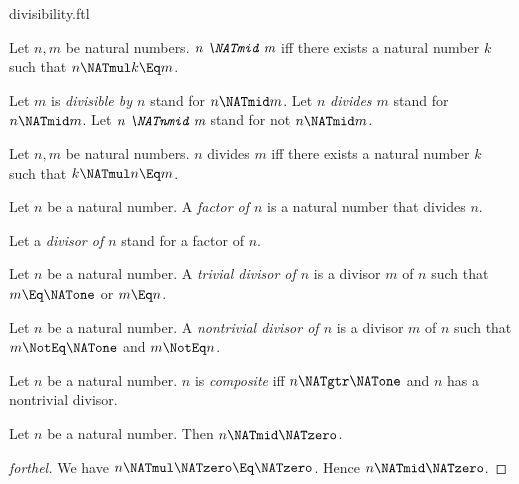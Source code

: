 \documentclass{stex}
\begin{document}
\begin{smodule}{divisibility.ftl}

\begin{definition}[forthel,id=ARITHMETIC_07_4239998993825792]
  Let $n, m$ be natural numbers.
  $\emph{n \NATmid m}$ iff there exists a natural number $k$ such that $n \NATmul k \Eq m$.

  Let $m$ is \emph{divisible by $n$} stand for $n \NATmid m$.
  Let $n$ \emph{divides $m$} stand for $n \NATmid m$.
  Let $\emph{n \NATnmid m}$ stand for not $n \NATmid m$.
\end{definition}

\begin{lemma}[forthel,id=ARITHMETIC_07_1478855118290944]
  Let $n, m$ be natural numbers.
  $n$ divides $m$ iff there exists a natural number $k$ such that $k \NATmul n \Eq m$.
\end{lemma}

\begin{definition}[forthel,id=ARITHMETIC_07_1311437490225152]
  Let $n$ be a natural number.
  A \emph{factor of $n$} is a natural number that divides $n$.

  Let a \emph{divisor of $n$} stand for a factor of $n$.
\end{definition}

\begin{definition}[forthel,id=ARITHMETIC_10_5438991513944064]
  Let $n$ be a natural number.
  A \emph{trivial divisor of $n$} is a divisor $m$ of $n$ such that $m \Eq \NATone$ or $m \Eq n$.
\end{definition}

\begin{definition}[forthel,id=ARITHMETIC_10_8768240253665280]
  Let $n$ be a natural number.
  A \emph{nontrivial divisor of $n$} is a divisor $m$ of $n$ such that $m \NotEq \NATone$ and $m \NotEq n$.
\end{definition}

\begin{definition}[forthel,id=ARITHMETIC_10_8020087063707648]
  Let $n$ be a natural number.
  $n$ is \emph{composite} iff $n \NATgtr \NATone$ and $n$ has a nontrivial divisor.
\end{definition}

\begin{proposition}[forthel,id=ARITHMETIC_07_2242720387039232]
  Let $n$ be a natural number.
  Then $n \NATmid \NATzero$.
\end{proposition}
\begin{proof}[forthel]
  We have $n \NATmul \NATzero \Eq \NATzero$.
  Hence $n \NATmid \NATzero$.
\end{proof}


\end{smodule}
\end{document}
